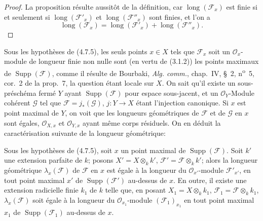 \begin{proof}
La proposition résulte aussitôt de la définition, car
$\operatorname{long}(\mathscr F_x)$ est finie si et seulement si
$\operatorname{long}(\mathscr F'_x)$ et
$\operatorname{long}(\mathscr F''_x)$ sont finies, et l'on a
\[
\operatorname{long}(\mathscr F_x)
=\operatorname{long}(\mathscr F'_x)+\operatorname{long}(\mathscr F''_x).
\]
\end{proof}

\begin{env}[4.7.7]
\label{IV.2.4.7.7-fr}
Sous les hypothèses de (4.7.5), les seuls points $x\in X$ tels que
$\mathscr F_x$ soit un $\mathcal O_x$-module de longueur finie non nulle sont
(en vertu de (3.1.2)) les points maximaux de
$\operatorname{Supp}(\mathscr F)$, comme il résulte de Bourbaki,
\emph{Alg. comm.}, chap.~IV, \S~2, n\textsuperscript{o}~5, cor.~2 de la
prop.~7, la question étant locale sur $X$. On sait qu'il existe un
sous-préschéma fermé $Y$ ayant $\operatorname{Supp}(\mathscr F)$ pour espace
sous-jacent, et un $\mathcal O_Y$-Module cohérent $\mathscr G$ tel que
$\mathscr F=j_*(\mathscr G)$, $j:Y\to X$ étant l'injection canonique. Si $x$
est point maximal de $Y$, on voit que les longueurs géométriques de
$\mathscr F$ et de $\mathscr G$ en $x$ sont égales, $\mathcal O_{X,x}$ et
$\mathcal O_{Y,x}$ ayant même corps résiduels. On en déduit la caractérisation
suivante de la longueur géométrique:
\end{env}

\begin{proposition}[4.7.8]
\label{IV.2.4.7.8-fr}
Sous les hypothèses de (4.7.5), soit $x$ un point maximal de
$\operatorname{Supp}(\mathscr F)$. Soit $k'$ une extension parfaite de $k$;
posons $X'=X\otimes_k k'$, $\mathscr F'=\mathscr F\otimes_k k'$; alors la
longueur géométrique $\lambda_x(\mathscr F)$ de $\mathscr F$ en $x$ est égale
à la longueur du $\mathcal O_{x'}$-module $\mathscr F'_{x'}$, en tout point
maximal $x'$ de $\operatorname{Supp}(\mathscr F')$ au-dessus de $x$. En outre,
il existe une extension radicielle finie $k_1$ de $k$ telle que, en posant
$X_1=X\otimes_k k_1$, $\mathscr F_1=\mathscr F\otimes_k k_1$,
$\lambda_x(\mathscr F)$ soit égale à la longueur du
$\mathcal O_{x_1}$-module $(\mathscr F_1)_{x_1}$ en tout point maximal $x_1$
de $\operatorname{Supp}(\mathscr F_1)$ au-dessus de $x$.
\end{proposition}

